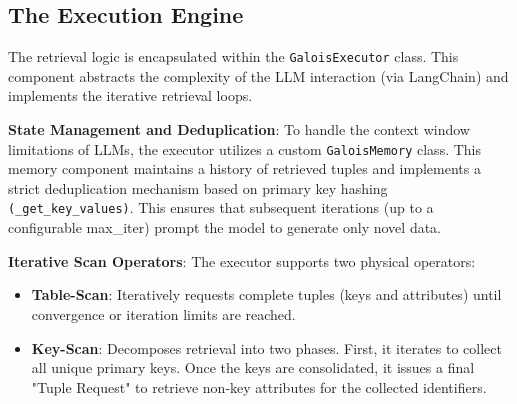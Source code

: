 \subsection{The Execution Engine}
The retrieval logic is encapsulated within the \texttt{GaloisExecutor} class. This component abstracts the complexity of the LLM interaction (via LangChain) and implements the iterative retrieval loops.

\textbf{State Management and Deduplication}: To handle the context window limitations of LLMs, the executor utilizes a custom \texttt{GaloisMemory} class. This memory component maintains a history of retrieved tuples and implements a strict deduplication mechanism based on primary key hashing \texttt{(\_get\_key\_values)}. This ensures that subsequent iterations (up to a configurable max\_iter) prompt the model to generate only novel data.

\textbf{Iterative Scan Operators}: The executor supports two physical operators:
\begin{itemize}
    \item \textbf{Table-Scan}: Iteratively requests complete tuples (keys and attributes) until convergence or iteration limits are reached.
    \item \textbf{Key-Scan}: Decomposes retrieval into two phases. First, it iterates to collect all unique primary keys. Once the keys are consolidated, it issues a final "Tuple Request"  to retrieve non-key attributes for the collected identifiers.
\end{itemize}






